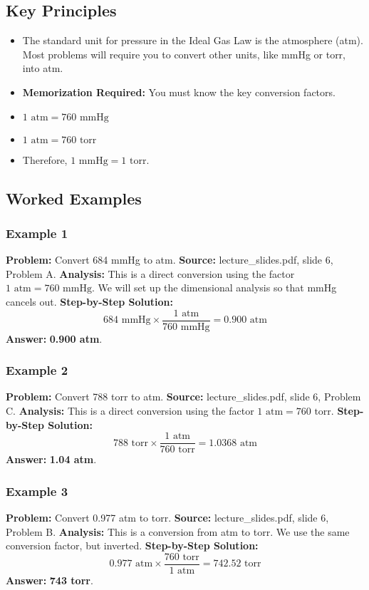 \documentclass{article}
\begin{document}
\subsection{Key Principles}
\begin{itemize}
    \item The standard unit for pressure in the Ideal Gas Law is the atmosphere (atm). Most problems will require you to convert other units, like mmHg or torr, into atm.
    \item \textbf{Memorization Required:} You must know the key conversion factors.
    \item $1 \text{ atm} = 760 \text{ mmHg}$
    \item $1 \text{ atm} = 760 \text{ torr}$
    \item Therefore, $1 \text{ mmHg} = 1 \text{ torr}$.
\end{itemize}

\subsection{Worked Examples}
\subsubsection{Example 1}
\textbf{Problem:} Convert 684 mmHg to atm.
\textbf{Source:} lecture\_slides.pdf, slide 6, Problem A.
\textbf{Analysis:} This is a direct conversion using the factor $1 \text{ atm} = 760 \text{ mmHg}$. We will set up the dimensional analysis so that mmHg cancels out.
\textbf{Step-by-Step Solution:}
\[ 684 \text{ mmHg} \times \frac{1 \text{ atm}}{760 \text{ mmHg}} = 0.900 \text{ atm} \]
\textbf{Answer:} \textbf{0.900 atm}.

\subsubsection{Example 2}
\textbf{Problem:} Convert 788 torr to atm.
\textbf{Source:} lecture\_slides.pdf, slide 6, Problem C.
\textbf{Analysis:} This is a direct conversion using the factor $1 \text{ atm} = 760 \text{ torr}$.
\textbf{Step-by-Step Solution:}
\[ 788 \text{ torr} \times \frac{1 \text{ atm}}{760 \text{ torr}} = 1.0368 \text{ atm} \]
\textbf{Answer:} \textbf{1.04 atm}.

\subsubsection{Example 3}
\textbf{Problem:} Convert 0.977 atm to torr.
\textbf{Source:} lecture\_slides.pdf, slide 6, Problem B.
\textbf{Analysis:} This is a conversion from atm to torr. We use the same conversion factor, but inverted.
\textbf{Step-by-Step Solution:}
\[ 0.977 \text{ atm} \times \frac{760 \text{ torr}}{1 \text{ atm}} = 742.52 \text{ torr} \]
\textbf{Answer:} \textbf{743 torr}.
\end{document}
